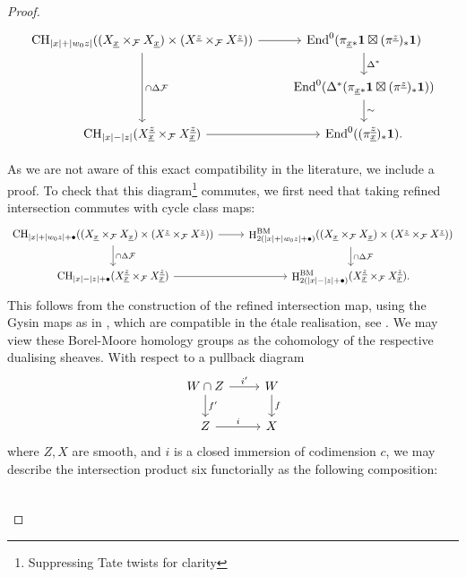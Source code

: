 \documentclass[11pt]{article}
\DeclareMathOperator{\End}{End}
\DeclareMathOperator{\CH}{\mathrm{CH}}
\DeclareMathOperator{\hH}{\mathrm{H}}
\theoremstyle{remark}
\theoremstyle{definition}
\begin{document}
\begin{proof}
\[\begin{tikzcd}
    \CH_{|x|+|w_0 z|}((X_{\underline{x}}\times_{\mathcal{F}}X_{\underline{x}})\times (X^{\underline{z}}\times_{\mathcal{F}}X^{\underline{z}}))\arrow[r]\arrow[dd,"\cap \Delta \mathcal{F}"]&\End^0(\pi_{\underline{x}\ast}\mathbf{1}\boxtimes (\pi^{\underline{z}})_*\mathbf{1})\arrow[d,"\Delta^*"]\\
    &\End^0(\Delta^*(\pi_{\underline{x}\ast}\mathbf{1}\boxtimes (\pi^{\underline{z}})_*\mathbf{1}))\arrow[d,"\sim"]\\
    \CH_{|x|-|z|}(X_{\underline{x}}^{\underline{z}}\times_{\mathcal{F}}X_{\underline{x}}^{\underline{z}})\arrow[r]&\End^0((\pi_{\underline{x}}^{\underline{z}})_*\mathbf{1}).
\end{tikzcd}\]
\par 
As we are not aware of this exact compatibility in the literature, we include a proof.
To check that this diagram\footnote{Suppressing Tate twists for clarity} commutes, we first need that taking refined intersection commutes with cycle class maps:
\[\begin{tikzcd}
    \CH_{|x|+|w_0z|+\bullet}((X_{\underline{x}}\times_{\mathcal{F}}X_{\underline{x}})\times (X^{\underline{z}}\times_{\mathcal{F}}X^{\underline{z}}))\arrow[r]\arrow[d,"\cap \Delta \mathcal{F}"]&\hH^{\text{BM}}_{2(|x|+|w_0z|+\bullet)}((X_{\underline{x}}\times_{\mathcal{F}}X_{\underline{x}})\times (X^{\underline{z}}\times_{\mathcal{F}}X^{\underline{z}}))\arrow[d,"\cap \Delta \mathcal{F}"]\\
    \CH_{|x|-|z|+\bullet}(X_{\underline{x}}^{\underline{z}}\times_{\mathcal{F}}X_{\underline{x}}^{\underline{z}})\arrow[r]&\hH^{\text{BM}}_{2(|x|-|z|+\bullet)}(X_{\underline{x}}^{\underline{z}}\times_{\mathcal{F}}X_{\underline{x}}^{\underline{z}}).
\end{tikzcd}\]
This follows from the construction of the refined intersection map, using the Gysin maps as in \cite{F84}, which are compatible in the \'{e}tale realisation, see \cite[\S23]{Mi80}. 
We may view these Borel-Moore homology groups as the cohomology of the respective dualising sheaves. With respect to a pullback diagram
\[\begin{tikzcd}
W\cap Z\arrow[r,"i'"]\arrow[d,"f'"]&W\arrow[d,"f"]\\
Z\arrow[r,"i"]&X
\end{tikzcd}\] where $Z,X$ are smooth, and $i$  is a closed immersion of codimension $c$, we may describe the intersection product six functorially as the following composition:
\[\begin{tikzcd}

\end{tikzcd}\]
\end{proof}
\end{document}
